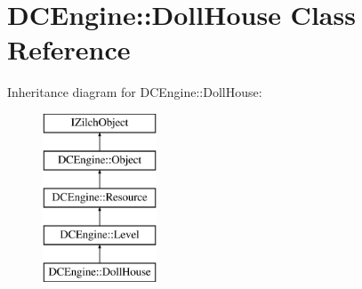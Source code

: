 \hypertarget{classDCEngine_1_1DollHouse}{\section{D\-C\-Engine\-:\-:Doll\-House Class Reference}
\label{classDCEngine_1_1DollHouse}
}
Inheritance diagram for D\-C\-Engine\-:\-:Doll\-House\-:\begin{figure}[H]
\begin{center}
\leavevmode
\includegraphics[height=5.000000cm]{classDCEngine_1_1DollHouse}
\end{center}
\end{figure}

